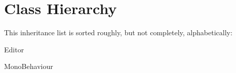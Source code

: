 \section{Class Hierarchy}
This inheritance list is sorted roughly, but not completely, alphabetically\+:\begin{DoxyCompactList}
\item {}
\item Editor\begin{DoxyCompactList}
\item {}
\end{DoxyCompactList}
\item Mono\+Behaviour\begin{DoxyCompactList}
\item {}
\item {}
\end{DoxyCompactList}
\item {}
\end{DoxyCompactList}
